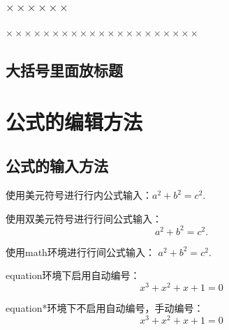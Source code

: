 \documentclass[10pt,a4paper]{article}
\begin{document}
    \subsubsection{$\times \times \times\times \times \times$}
    $\times \times \times\times \times \times\times \times \times\times \times \times\times \times \times\times \times \times\times \times \times$

    \subsection{大括号里面放标题}

    





    \newpage
    \section{公式的编辑方法}


    \subsection{公式的输入方法}
    使用美元符号进行行内公式输入：$a^2+b^2=c^2$.%

    使用双美元符号进行行间公式输入：$$a^2+b^2=c^2.$$%

    使用math环境进行行间公式输入：%
    \begin{math}
        a^2+b^2=c^2.
    \end{math}

    equation环境下启用自动编号：
    \begin{equation}%
        x^3+x^2+x+1=0
    \end{equation}

    equation*环境下不启用自动编号，手动编号：
    \begin{equation*}%
        x^3+x^2+x+1=0
        \tag{2.1}
    \end{equation*}
\end{document}
